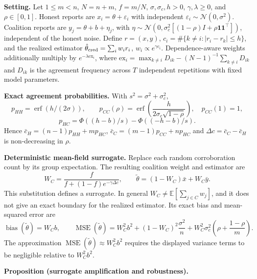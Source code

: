 \textbf{Setting.} Let \(1\le m<n\), \(N=n+m\), \(f=m/N\),
\(\sigma,\sigma_c,h>0\), \(\gamma,\lambda\ge0\), and \(\rho\in[0,1]\).
Honest reports are \(x_i=\theta+\varepsilon_i\) with independent
\(\varepsilon_i\sim\mathcal N(0,\sigma^2)\). Coalition reports are
\(y_j=\theta+b+\eta_j\), with
\(\eta\sim\mathcal N(0,\sigma_c^2[(1-\rho)I+\rho\mathbf1\mathbf1^\top])\),
independent of the honest noise. Define \(r=(x,y)\),
\(c_i=\#\{k\ne i:|r_i-r_k|\le h\}\), and the realized estimator
\(\hat\theta_{\rm cred}=\sum_i w_i r_i\), \(w_i\propto e^{\gamma c_i}\).
Dependence-aware weights additionally multiply by
\(e^{-\lambda\mathrm{ex}_i}\), where
\(\mathrm{ex}_i=\max_{k\ne i}D_{ik}-(N-1)^{-1}\sum_{k\ne i}D_{ik}\) and
\(D_{ik}\) is the agreement frequency across \(T\) independent
repetitions with fixed model parameters.

\textbf{Exact agreement probabilities.} With
\(s^2=\sigma^2+\sigma_c^2\), \[
p_{HH}=\operatorname{erf}(h/(2\sigma)),\qquad
p_{CC}(\rho)=\operatorname{erf}\!\left(\frac{h}{2\sigma_c\sqrt{1-\rho}}\right),\quad p_{CC}(1)=1,
\] \[
p_{HC}=\Phi((h-b)/s)-\Phi((-h-b)/s).
\] Hence \(\bar c_H=(n-1)p_{HH}+mp_{HC}\),
\(\bar c_C=(m-1)p_{CC}+np_{HC}\) and \(\Delta c=\bar c_C-\bar c_H\) is
non-decreasing in \(\rho\).

\textbf{Deterministic mean-field surrogate.} Replace each random
corroboration count by its group expectation. The resulting coalition
weight and estimator are \[
W_C=\frac{f}{f+(1-f)e^{-\gamma\Delta c}},\qquad
\tilde\theta=(1-W_C)\bar x+W_C\bar y.
\] This substitution defines a surrogate. In general
\(W_C\ne\mathbb E[\sum_{j\in C}w_j]\), and it does not give an exact
boundary for the realized estimator. Its exact bias and mean-squared
error are \[
\operatorname{bias}(\tilde\theta)=W_Cb,\qquad
\operatorname{MSE}(\tilde\theta)=W_C^2b^2+(1-W_C)^2\frac{\sigma^2}{n}
+W_C^2\sigma_c^2\left(\rho+\frac{1-\rho}{m}\right).
\] The approximation
\(\operatorname{MSE}(\tilde\theta)\approx W_C^2b^2\) requires the
displayed variance terms to be negligible relative to \(W_C^2b^2\).

\textbf{Proposition (surrogate amplification and robustness).}

